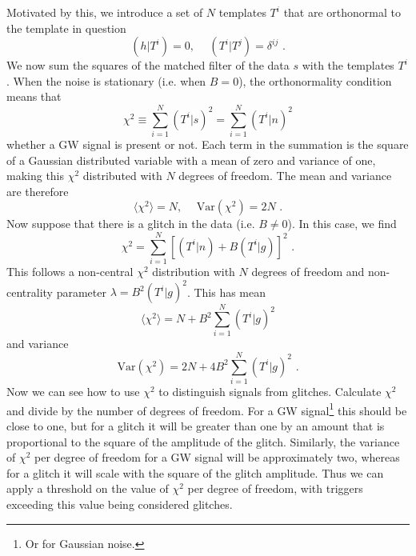 \documentclass[11pt]{cuthesis}
\newcommand{\fs}{\text{ .}}
\begin{document}
Motivated by this, we introduce a set of $N$ templates $T^i$ that are orthonormal to the template in question
\begin{equation}
(h|T^i) = 0, \hspace{15pt} (T^i|T^j) = \delta^{ij} \fs
\end{equation}
We now sum the squares of the matched filter of the data $s$ with the templates $T^i$. When the noise is stationary (i.e. when $B=0$), the orthonormality condition means that 
\begin{equation}
\chi^2 \equiv \sum_{i=1}^N(T^i|s)^2 = \sum_{i=1}^N(T^i|n)^2
\end{equation} 
whether a GW signal is present or not. Each term in the summation is the square of a Gaussian distributed variable with a mean of zero and variance of one, making this $\chi^2$ distributed with $N$ degrees of freedom. The mean and variance are therefore
\begin{equation}
\langle \chi^2 \rangle = N, \hspace{15pt} \text{Var}(\chi^2) = 2N \fs
\end{equation}
Now suppose that there is a glitch in the data (i.e. $B \neq 0$). In this case, we find
\begin{equation}
\chi^2 = \sum_{i=1}^N [ (T^i|n) + B(T^i|g)]^2 \fs
\end{equation}
This follows a non-central $\chi^2$ distribution with $N$ degrees of freedom and non-centrality parameter $\lambda = B^2(T^i|g)^2$.
This has mean
\begin{equation}
\langle \chi^2 \rangle = N + B^2 \sum_{i=1}^N (T^i|g)^2
\end{equation}
and variance
\begin{equation}
\text{Var}(\chi^2) = 2N + 4B^2 \sum_{i=1}^N (T^i|g)^2\fs
\end{equation}
Now we can see how to use $\chi^2$ to distinguish signals from glitches. Calculate $\chi^2$ and divide by the number of degrees of freedom. For a GW signal\footnote{Or for Gaussian noise.} this should be close to one, but for a glitch it will be greater than one by an amount that is proportional to the square of the amplitude of the glitch. Similarly, the variance of $\chi^2$ per degree of freedom for a GW signal will be approximately two, whereas for a glitch it will scale with the square of the glitch amplitude. Thus we can apply a threshold on the value of $\chi^2$ per degree of freedom, with triggers exceeding this value being considered glitches. 
\end{document}
